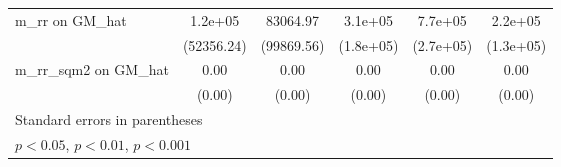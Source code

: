 {\begin{tabular}{l*{5}{c}}
\addlinespace
m\_rr on GM\_hat  &  1.2e+05\sym{*}  & 83064.97         &  3.1e+05         &  7.7e+05\sym{**} &  2.2e+05         \\
                &(52356.24)         &(99869.56)         &(1.8e+05)         &(2.7e+05)         &(1.3e+05)         \\
\addlinespace
m\_rr\_sqm2 on GM\_hat&     0.00         &     0.00         &     0.00         &     0.00         &     0.00\sym{*}  \\
                &   (0.00)         &   (0.00)         &   (0.00)         &   (0.00)         &   (0.00)         \\
\bottomrule
\multicolumn{6}{l}{\footnotesize Standard errors in parentheses}\\
\multicolumn{6}{l}{\footnotesize \sym{*} \(p<0.05\), \sym{**} \(p<0.01\), \sym{***} \(p<0.001\)}\\
\end{tabular}
}
